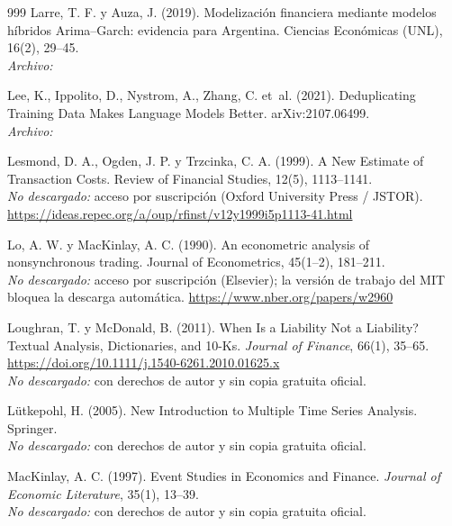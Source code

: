 \begin{thebibliography}{999}
Larre, T. F. y Auza, J. (2019). Modelización financiera mediante modelos híbridos Arima–Garch: evidencia para Argentina. Ciencias Económicas (UNL), 16(2), 29–45.
\\\textit{Archivo:} 

Lee, K., Ippolito, D., Nystrom, A., Zhang, C. et~al. (2021). Deduplicating Training Data Makes Language Models Better. arXiv:2107.06499.
\\\textit{Archivo:} 

Lesmond, D. A., Ogden, J. P. y Trzcinka, C. A. (1999). A New Estimate of Transaction Costs. Review of Financial Studies, 12(5), 1113–1141.
\\\textit{No descargado:} acceso por suscripción (Oxford University Press / JSTOR). \url{https://ideas.repec.org/a/oup/rfinst/v12y1999i5p1113-41.html}

Lo, A. W. y MacKinlay, A. C. (1990). An econometric analysis of nonsynchronous trading. Journal of Econometrics, 45(1–2), 181–211.
\\\textit{No descargado:} acceso por suscripción (Elsevier); la versión de trabajo del MIT bloquea la descarga automática. \url{https://www.nber.org/papers/w2960}

Loughran, T. y McDonald, B. (2011). When Is a Liability Not a Liability? Textual Analysis, Dictionaries, and 10-Ks. \emph{Journal of Finance}, 66(1), 35--65. \url{https://doi.org/10.1111/j.1540-6261.2010.01625.x}
\\\textit{No descargado:} con derechos de autor y sin copia gratuita oficial.

L{\"u}tkepohl, H. (2005). New Introduction to Multiple Time Series Analysis. Springer.
\\\textit{No descargado:} con derechos de autor y sin copia gratuita oficial.

MacKinlay, A. C. (1997). Event Studies in Economics and Finance. \emph{Journal of Economic Literature}, 35(1), 13--39.
\\\textit{No descargado:} con derechos de autor y sin copia gratuita oficial.


\end{thebibliography}
